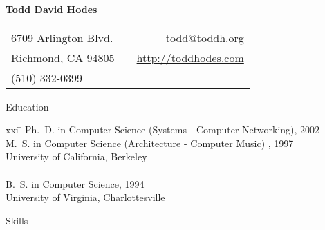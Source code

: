 \setlength{\oddsidemargin}{0.25 in}
\setlength{\evensidemargin}{-0.25 in}
\setlength{\topmargin}{-0.95 in}
\setlength{\textwidth}{6.5 in}
\setlength{\textheight}{10 in}
\setlength{\headsep}{0.35 in}
\setlength{\parindent}{0 in}
\setlength{\parskip}{0.01 in}


\addtolength{\evensidemargin}{-15pt}
\addtolength{\oddsidemargin}{-15pt}

\pagestyle{empty}


\begin{center} \bf
\Large
                               Todd David Hodes
\medskip
\normalsize


\begin{tabular}{lp{3.2in}r}
6709 Arlington Blvd.  & & todd@toddh.org \\
Richmond, CA  94805 & & \url{http://toddhodes.com} \\
(510)  332-0399 \\
\end{tabular}

\end{center}

\bigskip


\begin{bf} \large
Education \\[-18pt]
\end{bf}

\begin{tabbing}
xxi \= \kill
\>   Ph.\ D. in Computer Science (Systems - Computer Networking), 2002  \\
\>   M.\ S. in Computer Science (Architecture - Computer Music) , 1997 \\
\>   University of California, Berkeley  \\
\smallskip \\[-6pt]
\>   B.\ S. in Computer Science, 1994 \\
\>   University of Virginia, Charlottesville \\
\end{tabbing}


\begin{bf} \large
Skills  \\[-16pt]
\end{bf}

